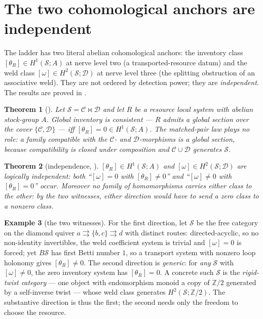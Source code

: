 \documentclass[11pt]{article}
\newtheorem{theorem}{Theorem}
\theoremstyle{definition}
\newtheorem{example}[theorem]{Example}
\newcommand{\Z}{\mathbb{Z}}
\newcommand{\sS}{\mathcal{S}}
\newcommand{\cC}{\mathcal{C}}
\newcommand{\cD}{\mathcal{D}}
\begin{document}
\section{The two cohomological anchors are independent}\label{sec:indep}

The ladder has two literal abelian cohomological anchors: the inventory class
$[\theta_R]\in H^1(\sS;A)$ at nerve level two (a transported-resource datum) and the weld class
$[\omega]\in H^2(\sS;\cD)$ at nerve level three (the splitting obstruction of an associative weld).
They are not ordered by
detection power; they are \emph{independent}. The results are proved in \cite{MacBethSupplyChain}.

\begin{theorem}[\cite{MacBethSupplyChain}]\label{thm:consistency}
Let $\sS=\cC\bowtie\cD$ and let $R$ be a resource local system with abelian stock-group $A$. Global
inventory is consistent --- $R$ admits a global section over the cover $\{\cC,\cD\}$ --- iff
$[\theta_R]=0\in H^1(\sS;A)$. The matched-pair law plays no role: a family compatible with the
$\cC$- and $\cD$-morphisms is a global section, because compatibility is closed under composition and
$\cC\cup\cD$ generates $\sS$.
\end{theorem}

\begin{theorem}[independence, \cite{MacBethSupplyChain}]\label{thm:sep}
$[\theta_R]\in H^1(\sS;A)$ and $[\omega]\in H^2(\sS;\cD)$ are logically independent: both
``$[\omega]=0$ with $[\theta_R]\neq 0$'' and ``$[\omega]\neq 0$ with $[\theta_R]=0$'' occur. Moreover
no family of homomorphisms carries either class to the other: by the two witnesses, either direction
would have to send a zero class to a nonzero class.
\end{theorem}

\begin{example}[the two witnesses]\label{ex:indep}
For the first direction, let $\sS$ be the free category on the diamond quiver
$a\rightrightarrows\{b,c\}\rightrightarrows d$ with distinct routes: directed-acyclic, so no
non-identity invertibles, the weld coefficient system is trivial and $[\omega]=0$ is forced; yet
$B\sS$ has first Betti number $1$, so a transport system with nonzero loop holonomy gives
$[\theta_R]\neq 0$. The second direction is \emph{generic}: for \emph{any} $\sS$ with $[\omega]\neq 0$,
the zero inventory system has $[\theta_R]=0$. A concrete such $\sS$ is the \emph{rigid-twist category}
--- one object with endomorphism monoid a copy of $\Z/2$ generated by a self-inverse twist --- whose
weld class generates $H^2(\sS;\Z/2)$. The substantive direction is thus the first; the second needs
only the freedom to choose the resource.
\end{example}
\end{document}

